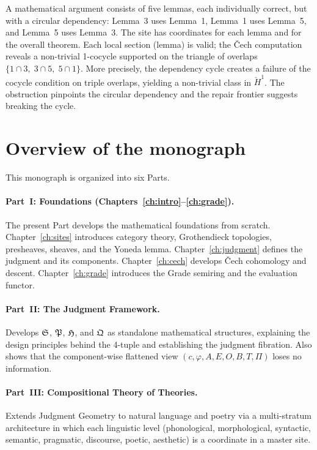 \begin{example}
\label{ex:intro:proof}
A mathematical argument consists of five lemmas, each individually
correct, but with a circular dependency: Lemma~3 uses Lemma~1,
Lemma~1 uses Lemma~5, and Lemma~5 uses Lemma~3.  The site has
coordinates for each lemma and for the overall theorem.  Each local
section (lemma) is valid; the \v{C}ech computation reveals a
non-trivial 1-cocycle supported on the triangle of overlaps
$\{1 \cap 3,\; 3 \cap 5,\; 5 \cap 1\}$.  More precisely, the
dependency cycle creates a failure of the cocycle condition on triple
overlaps, yielding a non-trivial class in $\check{H}^1$.  The
obstruction pinpoints the circular dependency and the repair frontier
suggests breaking the cycle.
\end{example}


\section{Overview of the monograph}
\label{sec:intro:overview}

This monograph is organized into six Parts.

\paragraph{Part~I: Foundations
  (Chapters~\ref{ch:intro}--\ref{ch:grade}).}
The present Part develops the mathematical foundations from scratch.
Chapter~\ref{ch:sites} introduces category theory, Grothendieck
topologies, presheaves, sheaves, and the Yoneda lemma.
Chapter~\ref{ch:judgment} defines the judgment and its components.
Chapter~\ref{ch:cech} develops \v{C}ech cohomology and descent.
Chapter~\ref{ch:grade} introduces the Grade semiring and the
evaluation functor.

\paragraph{Part~II: The Judgment Framework.}
Develops $\mathfrak{S}$, $\mathfrak{P}$, $\mathfrak{H}$, and $\mathfrak{Q}$ as standalone
mathematical structures, explaining the design principles behind
the 4-tuple and establishing the judgment fibration.  Also shows
that the component-wise flattened view
$(c, \varphi, A, E, O, B, T, \Pi)$ loses no information.

\paragraph{Part~III: Compositional Theory of Theories.}
Extends Judgment Geometry to natural language and poetry via a
multi-stratum architecture in which each linguistic level
(phonological, morphological, syntactic, semantic, pragmatic,
discourse, poetic, aesthetic) is a coordinate in a master site.

